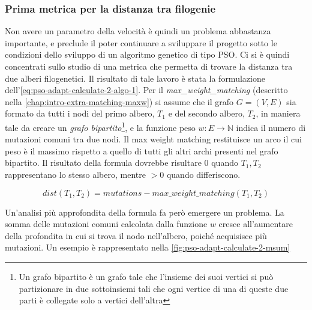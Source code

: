 \subsubsection{Prima metrica per la distanza tra filogenie}
\label{chap:pso-adapt-calculate-2}
Non avere un parametro della velocità è quindi un problema abbastanza importante, e preclude il poter continuare a sviluppare il progetto sotto le condizioni dello sviluppo di un algoritmo genetico di tipo PSO.
Ci si è quindi concentrati sullo studio di una metrica che permetta di trovare la distanza tra due alberi filogenetici. Il risultato di tale lavoro è stata la formulazione dell'\autoref{eq:pso-adapt-calculate-2-algo-1}. Per il \textit{max\_weight\_matching} (descritto nella \autoref{chap:intro-extra-matching-maxw}) si assume che il grafo $G = (V, E)$ sia formato da tutti i nodi del primo albero, $T_1$ e del secondo albero, $T_2$, in maniera tale da creare un \textit{grafo bipartito}\footnote{Un grafo bipartito è un grafo tale che l'insieme dei suoi vertici si può partizionare in due sottoinsiemi tali che ogni vertice di una di queste due parti è collegate solo a vertici dell'altra}, e la funzione peso $w: E \rightarrow \mathbb{N}$ indica il numero di mutazioni comuni tra due nodi. Il max weight matching restituisce un arco il cui peso è il massimo rispetto a quello di tutti gli altri archi presenti nel grafo bipartito. Il risultato della formula dovrebbe risultare $0$ quando $T_1, T_2$ rappresentano lo stesso albero, mentre $> 0$ quando differiscono.

\begin{equation}
  \label{eq:pso-adapt-calculate-2-algo-1}
  dist(T_1, T_2) = mutations - max\_weight\_matching(T_1, T_2)
\end{equation}

Un'analisi più approfondita della formula fa però emergere  un problema. La somma delle mutazioni comuni calcolata dalla funzione $w$ cresce all'aumentare della profondita in cui si trova il nodo nell'albero, poiché acquisisce più mutazioni. Un esempio è rappresentato nella \autoref{fig:pso-adapt-calculate-2-msum}

